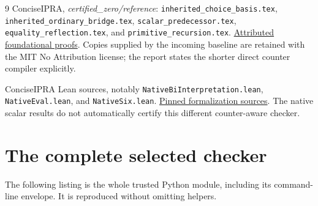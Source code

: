\begin{thebibliography}{9}
ConciseIPRA, \emph{certified\_zero/reference}:
\texttt{inherited\_choice\_basis.tex},
\texttt{inherited\_ordinary\_bridge.tex},
\texttt{scalar\_predecessor.tex},
\texttt{equality\_reflection.tex},
and \texttt{primitive\_recursion.tex}.
\href{https://github.com/VladimirReshetnikov/ProveIt/tree/0ebd0c6b358f38bb0ad2883faf775421599c8aae/Logic/PrimitiveRecursiveArithmetic/ConciseIPRA/Research/certified_zero/reference}{Attributed foundational proofs}.
Copies supplied by the incoming baseline are retained with the MIT No
Attribution license; the report states the shorter direct counter
compiler explicitly.

ConciseIPRA Lean sources, notably
\texttt{NativeBiInterpretation.lean},
\texttt{NativeEval.lean}, and \texttt{NativeSix.lean}.
\href{https://github.com/VladimirReshetnikov/ProveIt/tree/0ebd0c6b358f38bb0ad2883faf775421599c8aae/Logic/PrimitiveRecursiveArithmetic/ConciseIPRA/Lean/ConciseIPRA}{Pinned formalization sources}.
The native scalar results do not automatically certify this different
counter-aware checker.
\end{thebibliography}

\appendix
\section{The complete selected checker}
The following listing is the whole trusted Python module, including its
command-line envelope. It is reproduced without omitting helpers.

